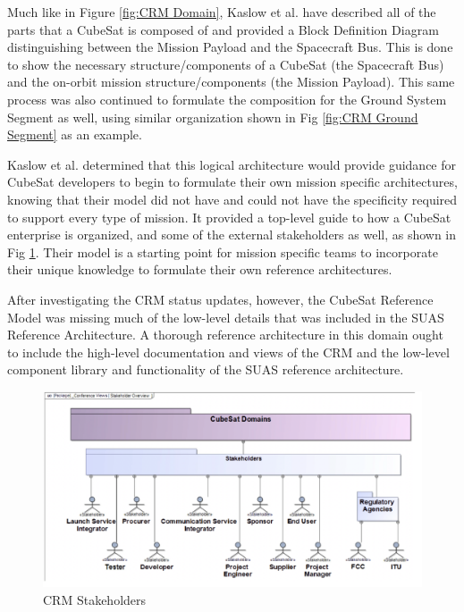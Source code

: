 Much like in Figure \ref{fig:CRM Domain}, Kaslow et al. have described all of the parts that a CubeSat is composed of and provided a Block Definition Diagram distinguishing between the Mission Payload and the Spacecraft Bus. This is done to show the necessary structure/components of a CubeSat (the Spacecraft Bus) and the on-orbit mission structure/components (the Mission Payload). This same process was also continued to formulate the composition for the Ground System Segment as well, using similar organization shown in Fig \ref{fig:CRM Ground Segment} as an example.

Kaslow et al. determined that this logical architecture would provide guidance for CubeSat developers to begin to formulate their own mission specific architectures, knowing that their model did not have and could not have the specificity required to support every type of mission. It provided a top-level guide to how a CubeSat enterprise is organized, and some of the external stakeholders as well, as shown in Fig \ref{fig:CRM Stakeholders}. Their model is a starting point for mission specific teams to incorporate their unique knowledge to formulate their own reference architectures.

After investigating the CRM status updates, however, the CubeSat Reference Model was missing much of the low-level details that was included in the SUAS Reference Architecture. A thorough reference architecture in this domain ought to include the high-level documentation and views of the CRM and the low-level component library and functionality of the SUAS reference architecture. 


\begin{figure}[!h]
    \centering
    \includegraphics[width=\textwidth]{Thesis/Literature_Review/Lit Review Figures/CubeSat Stakeholders.png}
    \caption{CRM Stakeholders}
    \label{fig:CRM Stakeholders}
\end{figure}



